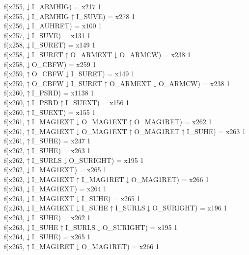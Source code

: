 f(x255,$\downarrow$I\_ARMHIG) = x217 {1} \\
f(x255,$\downarrow$I\_ARMHIG$\uparrow$I\_SUVE) = x278 {1} \\
f(x256,$\downarrow$I\_AUHRET) = x100 {1} \\
f(x257,$\downarrow$I\_SUVE) = x131 {1} \\
f(x258,$\downarrow$I\_SURET) = x149 {1} \\
f(x258,$\downarrow$I\_SURET$\uparrow$O\_ARMEXT$\downarrow$O\_ARMCW) = x238 {1} \\
f(x258,$\downarrow$O\_CBFW) = x259 {1} \\
f(x259,$\uparrow$O\_CBFW$\downarrow$I\_SURET) = x149 {1} \\
f(x259,$\uparrow$O\_CBFW$\downarrow$I\_SURET$\uparrow$O\_ARMEXT$\downarrow$O\_ARMCW) = x238 {1} \\
f(x260,$\uparrow$I\_PSRD) = x1138 {1} \\
f(x260,$\uparrow$I\_PSRD$\uparrow$I\_SUEXT) = x156 {1} \\
f(x260,$\uparrow$I\_SUEXT) = x155 {1} \\
f(x261,$\uparrow$I\_MAG1EXT$\downarrow$O\_MAG1EXT$\uparrow$O\_MAG1RET) = x262 {1} \\
f(x261,$\uparrow$I\_MAG1EXT$\downarrow$O\_MAG1EXT$\uparrow$O\_MAG1RET$\uparrow$I\_SUHE) = x263 {1} \\
f(x261,$\uparrow$I\_SUHE) = x247 {1} \\
f(x262,$\uparrow$I\_SUHE) = x263 {1} \\
f(x262,$\uparrow$I\_SURLS$\downarrow$O\_SURIGHT) = x195 {1} \\
f(x262,$\downarrow$I\_MAG1EXT) = x265 {1} \\
f(x262,$\downarrow$I\_MAG1EXT$\uparrow$I\_MAG1RET$\downarrow$O\_MAG1RET) = x266 {1} \\
f(x263,$\downarrow$I\_MAG1EXT) = x264 {1} \\
f(x263,$\downarrow$I\_MAG1EXT$\downarrow$I\_SUHE) = x265 {1} \\
f(x263,$\downarrow$I\_MAG1EXT$\downarrow$I\_SUHE$\uparrow$I\_SURLS$\downarrow$O\_SURIGHT) = x196 {1} \\
f(x263,$\downarrow$I\_SUHE) = x262 {1} \\
f(x263,$\downarrow$I\_SUHE$\uparrow$I\_SURLS$\downarrow$O\_SURIGHT) = x195 {1} \\
f(x264,$\downarrow$I\_SUHE) = x265 {1} \\
f(x265,$\uparrow$I\_MAG1RET$\downarrow$O\_MAG1RET) = x266 {1} \\
